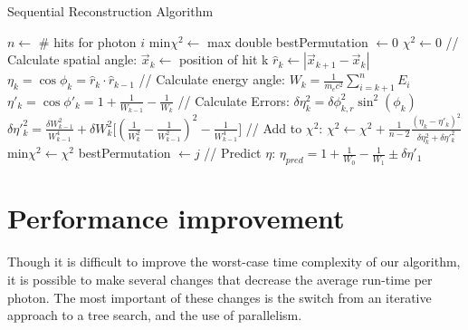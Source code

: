 \begin{algorithm}
\caption{Sequential Reconstruction Algorithm}\label{alg:seq}
\begin{algorithmic}
    \State $n \gets$ \# hits for photon $i$
    \State min$\chi^2 \gets$ max double
    \State bestPermutation $\gets 0$
        \State $\chi^2 \gets 0$
            \State // Calculate spatial angle:
            \State $\vec{x}_k \gets$ position of hit k
            \State $\hat{r}_k \gets |\vec{x}_{k+1} - \vec{x}_k|$ 
            \State $\eta_k = \cos{\phi_k} = \hat{r}_k\cdot\hat{r}_{k-1}$ 
            \State
            \State // Calculate energy angle:
            \State $W_k = \frac{1}{m_e c^2}\sum_{i=k+1}^n E_i$ 
            \State $\eta'_k = \cos{\phi'_k} = 1 + \frac{1}{W_{k-1}}-\frac{1}{W_k}$ 
            \State
            \State // Calculate Errors:
            \State $\delta\eta_k^2 = \delta\phi_{k,r}^2\sin^2(\phi_k)$ 
            \State $\delta\eta'^2_k = \frac{\delta W_{k-1}^2}{W_{k-1}^4}+\delta W_k^2 \big[(\frac{1}{W_k^2}-\frac{1}{W_{k-1}^2})^2 - \frac{1}{W_{k-1}^4}\big]$
            \State
            \State // Add to $\chi^2$:
            \State $\chi^2 \gets \chi^2 + \frac{1}{n-2} \frac{(\eta_k-\eta'_k)^2}{\delta\eta_k^2 + \delta\eta'^2_k}$
        \EndFor
        \State
        \State min$\chi^2 \gets \chi^2$
        \State bestPermutation $\gets j$
        \EndIf
    \EndFor
    \State
    \State // Predict $\eta$:
    \State $\eta_{pred} = 1 + \frac{1}{W_0}-\frac{1}{W_1} \pm \delta\eta'_1$
    \State
\EndFor
\end{algorithmic}
\end{algorithm}

\section{Performance improvement}
Though it is difficult to improve the worst-case time complexity of our algorithm, it is possible to make several changes that decrease the average run-time per photon. The most important of these changes is the switch from an iterative approach to a tree search, and the use of parallelism.

